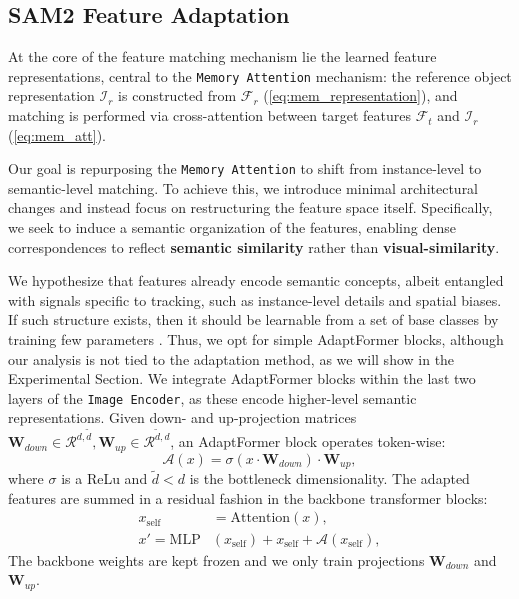 \subsection{SAM2 Feature Adaptation}
\label{sec:unlocking}
At the core of the feature matching mechanism lie the learned feature representations, central to the \texttt{Memory Attention} mechanism: the reference object representation $\mathcal{I}_r$ is constructed from $\mathcal{F}_r$ (\cref{eq:mem_representation}), and matching is performed via cross-attention between target features $\mathcal{F}_t$ and $\mathcal{I}_r$ (\cref{eq:mem_att}). 

Our goal is repurposing the \texttt{Memory Attention} to shift from instance-level to semantic-level matching. To achieve this, we introduce minimal architectural changes and instead focus on restructuring the feature space itself. Specifically, we seek to induce a semantic organization of the features, enabling dense correspondences to reflect \textbf{semantic similarity} rather than \textbf{visual-similarity}. 



We hypothesize that \sam{} features already encode semantic concepts, albeit entangled with signals specific to tracking, such as instance-level details and spatial biases. If such structure exists, then it should be learnable from a set of base classes by training few parameters \cite{aghajanyan2020intrinsic, hu2022lora, rusu2018meta}. Thus, we opt for simple AdaptFormer \cite{chen2022adaptformer} blocks, although our analysis is not tied to the adaptation method, as we will show in the Experimental Section. We integrate AdaptFormer blocks within the last two layers of the \texttt{Image Encoder}, as these encode higher-level semantic representations. Given down- and up-projection matrices $\mathbf{W}_{down} \in \mathcal{R}^{d, \tilde{d}}, \mathbf{W}_{up} \in \mathcal{R}^{\tilde{d}, d}$, an AdaptFormer block operates token-wise: 
\begin{equation}
\mathcal{A}(x) = \sigma(x \cdot \mathbf{W}_{down}) \cdot \mathbf{W}_{up},
\end{equation}
where $\sigma$ is a ReLu and $\tilde{d} < d$ is the bottleneck dimensionality.
The adapted features are summed in a residual fashion in the backbone transformer blocks: 
\begin{align}
x_{\text{self}} &= \mathrm{Attention}(x), \\
x' = \mathrm{MLP}&(x_{\text{self}}) + x_{\text{self}} + \mathcal{A}(x_{\text{self}}),
\end{align}
The backbone weights are kept frozen and we only train projections $\mathbf{W}_{down}$ and $\mathbf{W}_{up}$.



